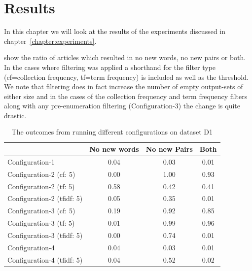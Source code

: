 \chapter{Results}
\label{chapter:results}
In this chapter we will look at the results of the experiments discussed in chapter~\ref{chapter:experiments}.

 show the ratio of articles which resulted in no new words, no new pairs or both. In the cases where filtering was applied a shorthand for the filter type (cf=collection frequency, tf=term frequency) is included as well as the threshold. We note that filtering does in fact increase the number of empty output-sets of either size and in the cases of the collection frequency and term frequency filters along with any pre-enumeration filtering (Configuration-3) the change is quite drastic.

\begin{center}
\begin{table}
  \begin{tabular}{|l|c|c|c|}
    \hline
    &  No new words & No new Pairs & Both \\ \hline
    Configuration-1                    & 0.04  & 0.03  & 0.01 \\ \hline
    Configuration-2 (cf: 5)            & 0.00  & 1.00  & 0.93 \\ \hline
    Configuration-2 (tf: 5)            & 0.58  & 0.42  & 0.41 \\ \hline
    Configuration-2 (tfidf: 5)         & 0.05  & 0.35  & 0.01 \\ \hline
    Configuration-3 (cf: 5)            & 0.19  & 0.92  & 0.85 \\ \hline
    Configuration-3 (tf: 5)            & 0.01  & 0.99  & 0.96 \\ \hline
    Configuration-3 (tfidf: 5)         & 0.00  & 0.74  & 0.01 \\ \hline
    Configuration-4                    & 0.04  & 0.03  & 0.01 \\ \hline
    Configuration-4 (tfidf: 5)         & 0.04  & 0.52  & 0.02 \\ \hline
  \end{tabular}
  \caption{The outcomes from running different configurations on dataset D1}
  \label{tab:d1}
\end{table}
\end{center}

